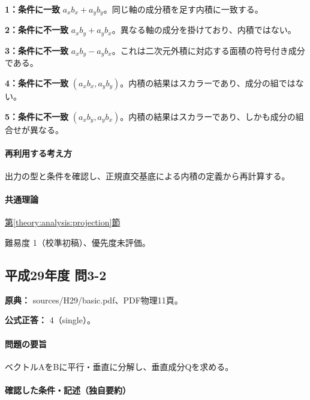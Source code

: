\noindent\textbf{1：条件に一致} \(a_xb_x+a_yb_y\)。同じ軸の成分積を足す内積に一致する。\par

\noindent\textbf{2：条件に不一致} \(a_xb_y+a_yb_x\)。異なる軸の成分を掛けており、内積ではない。\par

\noindent\textbf{3：条件に不一致} \(a_xb_y-a_yb_x\)。これは二次元外積に対応する面積の符号付き成分である。\par

\noindent\textbf{4：条件に不一致} \((a_xb_x,a_yb_y)\)。内積の結果はスカラーであり、成分の組ではない。\par

\noindent\textbf{5：条件に不一致} \((a_xb_y,a_yb_x)\)。内積の結果はスカラーであり、しかも成分の組合せが異なる。\par

\paragraph{再利用する考え方} 出力の型と条件を確認し、正規直交基底による内積の定義から再計算する。

\paragraph{共通理論} \hyperref[theory:analysis:projection]{第\ref*{theory:analysis:projection}節}

\par 難易度 1（校準初稿）、優先度未評価。

\subsection{平成29年度 問3-2}
\label{q:h29-reg-basic-3-2}

\noindent\textbf{原典：} sources/H29/basic.pdf、PDF物理11頁。

\textbf{公式正答：} 4（single）。

\paragraph{問題の要旨} ベクトルAをBに平行・垂直に分解し、垂直成分Qを求める。

\paragraph{確認した条件・記述（独自要約）}\mbox{}\par

